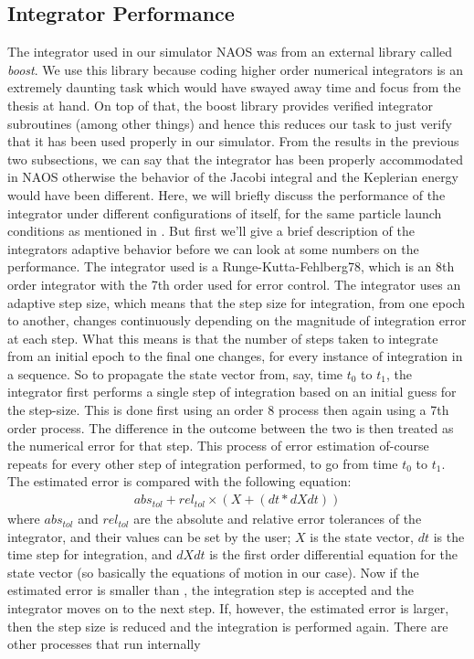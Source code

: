 \subsection{Integrator Performance}
\label{subsec:integrator_tuning_vv}
The integrator used in our simulator \gls{NAOS} was from an external library called \emph{boost}. We use this library because coding higher order numerical integrators is an extremely daunting task which would have swayed away time and focus from the thesis at hand. On top of that, the boost library provides verified integrator subroutines (among other things) and hence this reduces our task to just verify that it has been used properly in our simulator. From the results in the previous two subsections, we can say that the integrator has been properly accommodated in \gls{NAOS} otherwise the behavior of the Jacobi integral and the Keplerian energy would have been different. Here, we will briefly discuss the performance of the integrator under different configurations of itself, for the same particle launch conditions as mentioned in . But first we'll give a brief description of the integrators adaptive behavior before we can look at some numbers on the performance.
%
\newline\newline
%
The integrator used is a Runge-Kutta-Fehlberg78, which is an 8th order integrator with the 7th order used for error control. The integrator uses an adaptive step size, which means that the step size for integration, from one epoch to another, changes continuously depending on the magnitude of integration error at each step. What this means is that the number of steps taken to integrate from an initial epoch to the final one changes, for every instance of integration in a sequence. So to propagate the state vector from, say, time $t_0$ to $t_1$, the integrator first performs a single step of integration based on an initial guess for the step-size. This is done first using an order 8 process then again using a 7th order process. The difference in the outcome between the two is then treated as the numerical error for that step. This process of error estimation of-course repeats for every other step of integration performed, to go from time $t_0$ to $t_1$. The estimated error is compared with the following equation:
\begin{align}
abs_{tol} + rel_{tol} \times ( X + ( dt * dXdt ) )
\label{eqn:integrator_abs_rel_tol}
\end{align}
where $abs_{tol}$ and $rel_{tol}$ are the absolute and relative error tolerances of the integrator, and their values can be set by the user; $X$ is the state vector, $dt$ is the time step for integration, and $dXdt$ is the first order differential equation for the state vector (so basically the equations of motion in our case). Now if the estimated error is smaller than , the integration step is accepted and the integrator moves on to the next step. If, however, the estimated error is larger, then the step size is reduced and the integration is performed again. There are other processes that run internally
